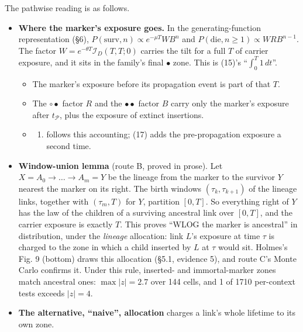 \documentclass[10pt,]{article}
\providecommand{\tightlist}{%
  \setlength{\itemsep}{0pt}\setlength{\parskip}{0pt}}
\begin{document}
The pathwise reading is as follows.

\begin{itemize}
\tightlist
\item
  \textbf{Where the marker's exposure goes.} In the generating-function
  representation (§6), \(P(\text{surv},n)\propto e^{-\mu T}W B^n\) and
  \(P(\text{die},n\ge1)\propto W R B^{n-1}\). The factor
  \(W=e^{-\theta T}\mathcal I_D(T,T;0)\) carries the tilt for a full
  \(T\) of carrier exposure, and it sits in the family's final
  \(\bullet\) zone. This is (15)'s ``\(\int_0^T1\,dt\)''.

  \begin{itemize}
  \item
    The marker's exposure before its propagation event is part of that
    \(T\).
  \item
    The \(\circ\bullet\) factor \(R\) and the \(\bullet\bullet\) factor
    \(B\) carry only the marker's exposure after \(t_{\mathcal P}\),
    plus the exposure of extinct insertions.
  \item
    \begin{enumerate}
    \def\labelenumi{(\arabic{enumi})}
    \setcounter{enumi}{15}
    \tightlist
    \item
      follows this accounting; (17) adds the pre-propagation exposure a
      second time.
    \end{enumerate}
  \end{itemize}
\item
  \textbf{Window-union lemma} (route B, proved in prose). Let
  \(X=A_0\to\dots\to A_m=Y\) be the lineage from the marker to the
  survivor \(Y\) nearest the marker on its right. The birth windows
  \((\tau_k,\tau_{k+1})\) of the lineage links, together with
  \((\tau_m,T)\) for \(Y\), partition \([0,T]\). So everything right of
  \(Y\) has the law of the children of a surviving ancestral link over
  \([0,T]\), and the carrier exposure is exactly \(T\). This proves
  ``WLOG the marker is ancestral'' in distribution, under the
  \emph{lineage} allocation: link \(L\)'s exposure at time \(\tau\) is
  charged to the zone in which a child inserted by \(L\) at \(\tau\)
  would sit. Holmes's Fig. 9 (bottom) draws this allocation (§5.1,
  evidence 5), and route C's Monte Carlo confirms it. Under this rule,
  inserted- and immortal-marker zones match ancestral ones:
  \(\max|z|=2.7\) over 144 cells, and 1 of 1710 per-context tests
  exceeds \(|z|=4\).
\item
  \textbf{The alternative, ``naive'', allocation} charges a link's whole
  lifetime to its own zone.


\end{itemize}
\end{document}
